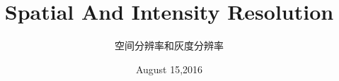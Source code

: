 \documentclass[notheorems,serif,table,compress]{beamer}  %
\begin{document}
\title{Spatial And Intensity Resolution}
\subtitle{\color{red}空间分辨率和灰度分辨率}
\author[]{\color{red}{TanLin}}
\date[]{\color{red}August 15,2016}
\frame{ \titlepage }
\def\hilite<#1>{\temporal<#1>{\color{blue!15}}{\color{black}}{\color{black}}}
\newcommand{\shadow}[2][purple]{\hskip5pt\shadowbox{\color{#1}\small \kai #2\vspace{3mm}}}
\newcommand{\colorrbox}[2][purple]{\doublebox{\color{#1}\small \kai#2}}

\end{document}
